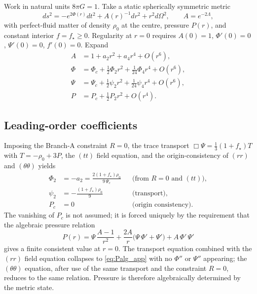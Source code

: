 \documentclass[aps,prd,twocolumn,nofootinbib,floatfix,superscriptaddress]{revtex4-2}
\begin{document}
Work in natural units $8\pi G=1$. Take a static spherically
symmetric metric
\begin{equation}
ds^2 = -e^{2\Phi(r)}dt^2 + A(r)^{-1}dr^2 + r^2 d\Omega^2,
\qquad A = e^{-2\Lambda},
\end{equation}
with perfect-fluid matter of density $\rho_0$ at the centre,
pressure $P(r)$, and constant interior $f=f_\star\geq 0$. Regularity
at $r=0$ requires $A(0)=1$, $\Phi'(0)=0$, $\Psi'(0)=0$, $f'(0)=0$.
Expand
\begin{align}
A &= 1 + a_2 r^2 + a_4 r^4 + O(r^6), \\
\Phi &= \Phi_c + \tfrac{1}{2}\Phi_2 r^2 + \tfrac{1}{24}\Phi_4 r^4 + O(r^6), \\
\Psi &= \Psi_c + \tfrac{1}{2}\psi_2 r^2 + \tfrac{1}{24}\psi_4 r^4 + O(r^6), \\
P &= P_c + \tfrac{1}{2}P_2 r^2 + O(r^4).
\end{align}

\subsection{Leading-order coefficients}

Imposing the Branch-A constraint $R=0$, the trace transport
$\Box\Psi=\tfrac{1}{3}(1+f_\star)T$ with $T=-\rho_0+3P$, the
$(tt)$ field equation, and the origin-consistency of $(rr)$ and
$(\theta\theta)$ yields
\begin{align}
\Phi_2 &= -a_2 = \tfrac{2(1+f_\star)\rho_0}{9\,\Psi_c}
&&\text{(from }R=0\text{ and }(tt)\text{)}, \\
\psi_2 &= -\tfrac{(1+f_\star)\rho_0}{9}
&&\text{(transport)}, \\
P_c &= 0
&&\text{(origin consistency)}.
\end{align}
The vanishing of $P_c$ is not assumed; it is forced uniquely
by the requirement that the algebraic pressure relation
\begin{equation}
\label{eq:Palg_app}
P(r) = \Psi\,\frac{A-1}{r^2} + \frac{2A}{r}\bigl(\Psi\,\Phi'+\Psi'\bigr)
        + A\,\Phi'\,\Psi'
\end{equation}
gives a finite consistent value at $r=0$. The transport equation
combined with the $(rr)$ field equation collapses to
\eqref{eq:Palg_app} with no $\Phi''$ or $\Psi''$ appearing; the
$(\theta\theta)$ equation, after use of the same transport and the
constraint $R=0$, reduces to the same relation. Pressure is therefore
algebraically determined by the metric state.
\end{document}
